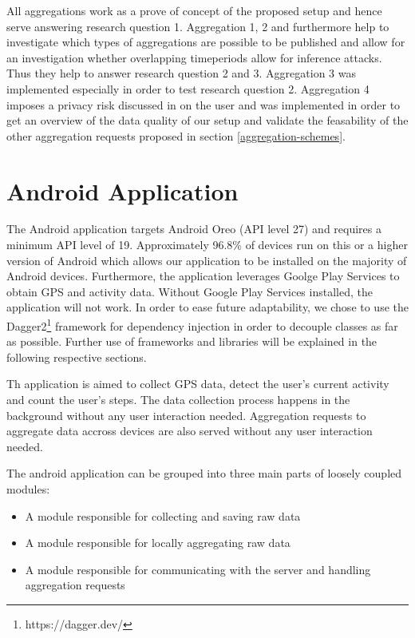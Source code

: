All aggregations work as a prove of concept of the proposed setup and hence serve answering research question 1. Aggregation 1, 2 and furthermore help to investigate which types of aggregations are possible to be published and allow for an investigation whether overlapping timeperiods allow for inference attacks. Thus  they help to answer research question 2 and 3. Aggregation 3 was implemented especially in order to test research question 2.
Aggregation 4 imposes a privacy risk discussed in \parencite{twitter, cellphone, krumm} on the user and was implemented in order to get an overview of the data quality of our setup and validate the feasability of the other aggregation requests proposed in section \ref{aggregation-schemes}.

\section{Android Application}
The Android application targets Android Oreo (API level 27) and requires a minimum API level of 19. Approximately 96.8\% of devices run on this or a higher version of Android \cite{android-api-level-share} which allows our application to be installed on the majority of Android devices.
Furthermore, the application leverages Goolge Play Services to obtain GPS and activity data. Without Google Play Services installed, the application will not work. In order to ease future adaptability, we chose to use the Dagger2\footnote{https://dagger.dev/} framework for dependency injection in order to decouple classes as far as possible. Further use of frameworks and libraries will be explained in the following respective sections.

Th application is aimed to collect GPS data, detect the user's current activity and count the user's steps. The data collection process happens in the background without any user interaction needed. Aggregation requests to aggregate data accross devices are also served without any user interaction needed.
\begin{samepage}
The android application can be grouped into three main parts of loosely coupled modules:
\begin{itemize}
	\item A module responsible for collecting and saving raw data
	\item A module responsible for locally aggregating raw data
	\item A module responsible for communicating with the server and handling aggregation requests
\end{itemize}
\end{samepage}

